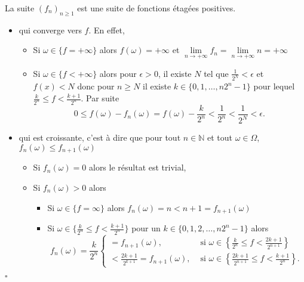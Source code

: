\documentclass[8pt,notheorems]{beamer}
\def \N{\mathbb N}
\def \Om{\Omega}
\def \om{\omega}
\theoremstyle{definition}
\theoremstyle{example}
\theoremstyle{mystyle}
\theoremstyle{plain}
\begin{document}
\begin{frame}[allowframebreaks]
La suite $(f_n)_{n\geq1}$ est une suite de fonctions étagées positives.
\begin{itemize}
\item qui converge vers $f$. En effet,
\begin{itemize}
\item Si $\om\in\{f=+\infty\}$ alors $f(\om)=+\infty$ et $\underset{n\rightarrow+\infty}{\lim} f_n=\underset{n\rightarrow+\infty}{\lim} n = +\infty$
\item Si $\om\in\{f<+\infty\}$ alors pour $\epsilon>0$, il existe $N$ tel que $\frac{1}{2^{N}}<\epsilon$ et $f(x)<N$ donc pour $n\geq N$ il existe $k\in\{0,1,\ldots, n2^{n}-1\}$ pour lequel $\frac{k}{2^{n}}\leq f<\frac{k+1}{2^{n}}$. Par suite
$$
0\leq f(\om)-f_{n}(\om)=f(\om)-\frac{k}{2^{n}}<\frac{1}{2^{n}}<\frac{1}{2^{N}}<\epsilon.
$$
\end{itemize}
\item qui est croissante, c'est à dire que pour tout $n\in\N$ et tout $\om\in\Om$, $f_{n}(\om)\leq f_{n+1}(\om)$
\begin{itemize}
\item Si $f_{n}(\om)=0$ alors le résultat est trivial,
\item Si $f_{n}(\om)>0$ alors
\begin{itemize}
\item Si $\om\in\{f=\infty\}$ alors $f_n(\om)=n<n+1=f_{n+1}(\om)$
\item Si $\om \in\{\frac{k}{2^{n}}\leq f<\frac{k+1}{2^{n}}\}$ pour un $k\in\{0,1,2,\ldots,n2^{n}-1\}$ alors
$$
f_{n}(\om)=\frac{k}{2^{n}}
\begin{cases}
=f_{n+1}(\om),&\text{ si }\om\in\left\{\frac{k}{2^{n}}\leq f< \frac{2k+1}{2^{n+1}}\right\}\\
 <\frac{2k+1}{2^{k+1}}=f_{n+1}(\om),&\text{ si }\om\in\left\{\frac{2k+1}{2^{n+1}}\leq f< \frac{k+1}{2^{n}}\right\}.
\end{cases}
$$
\end{itemize}
\end{itemize}
\end{itemize}
$\square$
\end{frame}
\end{document}
